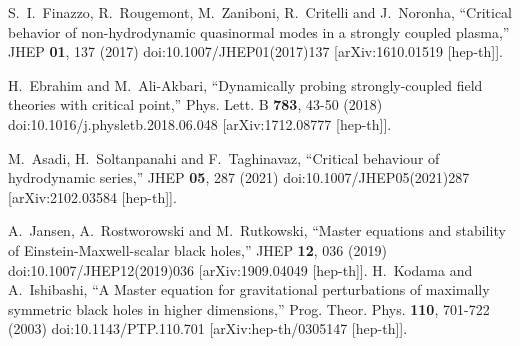 \documentclass[preprintnumbers,aps,prd,longbibliography,nofootinbib,nobibnotes,amsmath,amssymb]{revtex4}
\begin{document}
\begin{thebibliography}{99}
S.~I.~Finazzo, R.~Rougemont, M.~Zaniboni, R.~Critelli and J.~Noronha,
``Critical behavior of non-hydrodynamic quasinormal modes in a strongly coupled plasma,''
JHEP \textbf{01}, 137 (2017)
doi:10.1007/JHEP01(2017)137
[arXiv:1610.01519 [hep-th]].

H.~Ebrahim and M.~Ali-Akbari,
``Dynamically probing strongly-coupled field theories with critical point,''
Phys. Lett. B \textbf{783}, 43-50 (2018)
doi:10.1016/j.physletb.2018.06.048
[arXiv:1712.08777 [hep-th]].

M.~Asadi, H.~Soltanpanahi and F.~Taghinavaz,
``Critical behaviour of hydrodynamic series,''
JHEP \textbf{05}, 287 (2021)
doi:10.1007/JHEP05(2021)287
[arXiv:2102.03584 [hep-th]].

A.~Jansen, A.~Rostworowski and M.~Rutkowski,
``Master equations and stability of Einstein-Maxwell-scalar black holes,''
JHEP \textbf{12}, 036 (2019)
doi:10.1007/JHEP12(2019)036
[arXiv:1909.04049 [hep-th]].
H.~Kodama and A.~Ishibashi,
``A Master equation for gravitational perturbations of maximally symmetric black holes in higher dimensions,''
Prog. Theor. Phys. \textbf{110}, 701-722 (2003)
doi:10.1143/PTP.110.701
[arXiv:hep-th/0305147 [hep-th]].








\end{thebibliography}
\end{document}
